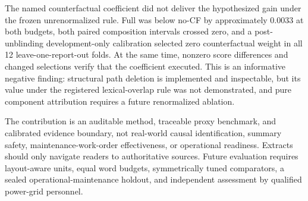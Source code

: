 \documentclass[applsci,article,submit,moreauthors]{Definitions/mdpi}
\begin{document}
The named counterfactual coefficient did not deliver the hypothesized gain under the frozen unrenormalized rule. Full was below no-CF by approximately 0.0033 at both budgets, both paired composition intervals crossed zero, and a post-unblinding development-only calibration selected zero counterfactual weight in all 12 leave-one-report-out folds. At the same time, nonzero score differences and changed selections verify that the coefficient executed. This is an informative negative finding: structural path deletion is implemented and inspectable, but its value under the registered lexical-overlap rule was not demonstrated, and pure component attribution requires a future renormalized ablation.

The contribution is an auditable method, traceable proxy benchmark, and calibrated evidence boundary, not real-world causal identification, summary safety, maintenance-work-order effectiveness, or operational readiness. Extracts should only navigate readers to authoritative sources. Future evaluation requires layout-aware units, equal word budgets, symmetrically tuned comparators, a sealed operational-maintenance holdout, and independent assessment by qualified power-grid personnel.
\end{document}
